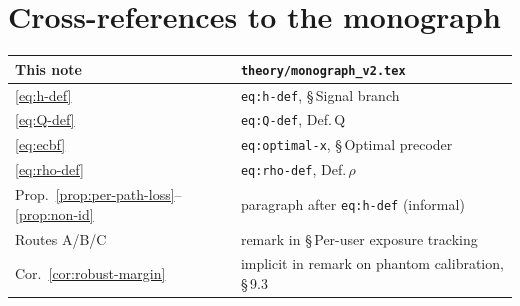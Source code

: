 \documentclass[11pt,a4paper]{article}
\theoremstyle{definition}
\begin{document}
\section{Cross-references to the monograph}
\label{app:xrefs}

\begin{center}
\small
\begin{tabular}{ll}
\toprule
This note & \texttt{theory/monograph\_v2.tex} \\
\midrule
\eqref{eq:h-def} & \texttt{eq:h-def}, \S\,Signal branch \\
\eqref{eq:Q-def} & \texttt{eq:Q-def}, Def.\,Q \\
\eqref{eq:ecbf} & \texttt{eq:optimal-x}, \S\,Optimal precoder \\
\eqref{eq:rho-def} & \texttt{eq:rho-def}, Def.\,$\rho$ \\
Prop.~\ref{prop:per-path-loss}--\ref{prop:non-id}
  & paragraph after \texttt{eq:h-def} (informal) \\
Routes A/B/C
  & remark in \S\,Per-user exposure tracking \\
Cor.~\ref{cor:robust-margin}
  & implicit in remark on phantom calibration, \S\,9.3 \\
\bottomrule
\end{tabular}
\end{center}
\end{document}

